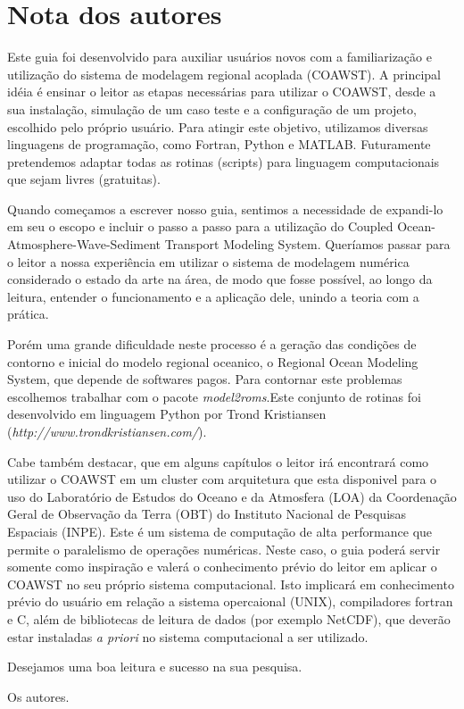 \chapter*{Nota dos autores}

\noindent Este guia foi desenvolvido para auxiliar usuários novos com a familiarização e utilização do sistema de modelagem regional acoplada (COAWST). A principal idéia é ensinar o leitor as etapas necessárias para utilizar o COAWST, desde a sua instalação, simulação de um caso teste e a configuração de um projeto, escolhido pelo próprio usuário. Para atingir este objetivo, utilizamos diversas linguagens de programação, como Fortran, Python e MATLAB. Futuramente pretendemos adaptar todas as rotinas (scripts) para linguagem computacionais que sejam livres (gratuitas).
\bigskip

\noindent Quando começamos a escrever nosso guia, sentimos a necessidade de expandi-lo em seu o escopo e incluir o passo a passo para a utilização do Coupled Ocean-Atmosphere-Wave-Sediment Transport Modeling System. Queríamos passar para o leitor a nossa experiência em utilizar o sistema de modelagem numérica considerado o estado da arte na área, de modo que fosse possível, ao longo da leitura, entender o funcionamento e a aplicação dele, unindo a teoria com a prática.
\bigskip

\noindent Porém uma grande dificuldade neste processo é a geração das condições de contorno e inicial do modelo regional oceanico, o Regional Ocean Modeling System, que depende de softwares pagos. Para contornar este problemas escolhemos trabalhar com o pacote \textit{model2roms}.Este conjunto de rotinas foi desenvolvido em linguagem Python por Trond Kristiansen (\textcolor{bleu_cite}{\textit{http://www.trondkristiansen.com/}}).

\noindent Cabe também destacar, que em alguns capítulos o leitor irá encontrará como utilizar o COAWST em um cluster com arquitetura que esta disponivel para o uso do Laboratório de Estudos do Oceano e da Atmosfera (LOA) da Coordenação Geral de Observação da Terra (OBT) do Instituto Nacional de Pesquisas Espaciais (INPE). Este é um sistema de computação de alta performance que permite o paralelismo de operações numéricas. Neste caso, o guia poderá servir somente como inspiração e valerá o conhecimento prévio do leitor em aplicar o COAWST no seu próprio sistema computacional. Isto implicará em conhecimento prévio do usuário em relação a sistema opercaional (UNIX), compiladores fortran e C, além de bibliotecas de leitura de dados (por exemplo NetCDF), que deverão estar instaladas \textit{a priori} no sistema computacional a ser utilizado.
\bigskip

\noindent Desejamos uma boa leitura e sucesso na sua pesquisa.
\begin{flushright}
\noindent Os autores.
\end{flushright}
